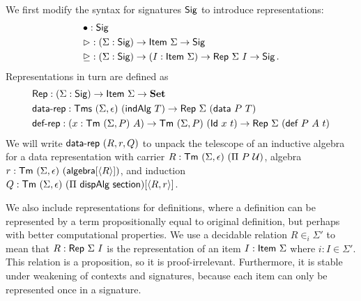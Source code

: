 We first modify the syntax for signatures $\textsf{Sig}$ to introduce representations:
\begin{align*}
	 & \bullet : \Sig \\
	 & \rhd : (\Sigma : \Sig) \to \Item\ \Sigma \to \Sig \\
	 & \unrhd : (\Sigma : \Sig) \to (I : \Item\ \Sigma) \to \Rep\ \Sigma\ I \to \Sig \,.
\end{align*}
Representations in turn are defined as
\begin{align*}
& \Rep : (\Sigma : \Sig) \to \Item\ \Sigma \to \Set \\
& \mta{data-rep} : \Tms\ (\Sigma, \epsilon)\ (\mta{indAlg}\ T) \to \Rep\ \Sigma\ (\mta{data}\ P\ T) \\
& \mta{def-rep} : (x : \Tm\ (\Sigma, P)\ A) \to \Tm\ (\Sigma, P)\ (\mta{Id}\ x\ t) \to \Rep\ \Sigma\ (\mta{def}\ P\ A\ t)
\end{align*}
We will write $\textsf{data-rep}\ (R, r, Q)$ to unpack the telescope of an
inductive algebra for a data representation with carrier $R : \textsf{Tm}\ (\Sigma,
\epsilon)\ (\Pi\ P\ \mathcal{U})$, algebra $r : \textsf{Tm}\ (\Sigma, \epsilon)\
(\textsf{algebra}[\langle R\rangle])$, and induction $Q : \textsf{Tm}\ (\Sigma, \epsilon)\ (\Pi\
\textsf{dispAlg}\ \textsf{section})[\langle R, r\rangle]$.

We also include representations for definitions, where a definition can be
represented by a term propositionally equal to original definition, but perhaps
with better computational properties.
We use a decidable relation $R \in_i \Sigma'$ to mean that $R :
\textsf{Rep}\ \Sigma\ I$ is the representation of an item $I : \textsf{Item}\ \Sigma$
where $i : I \in \Sigma'$.
This relation is a proposition, so it is proof-irrelevant. Furthermore, it is stable under
weakening of contexts and signatures, because each item can only be represented once in a signature.



